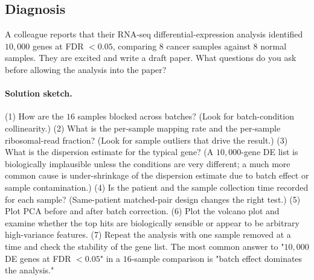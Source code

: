 \subsection*{Diagnosis}

\begin{exercise}
A colleague reports that their RNA-seq differential-expression
analysis identified $10{,}000$ genes at FDR $< 0.05$, comparing
$8$ cancer samples against $8$ normal samples. They are excited and
write a draft paper. What questions do you ask before allowing the
analysis into the paper?

\paragraph{Solution sketch.}
(1) How are the $16$ samples blocked across batches? (Look for
batch-condition collinearity.) (2) What is the per-sample mapping
rate and the per-sample ribosomal-read fraction? (Look for sample
outliers that drive the result.) (3) What is the dispersion estimate
for the typical gene? (A $10{,}000$-gene DE list is biologically
implausible unless the conditions are very different; a much more
common cause is under-shrinkage of the dispersion estimate due to
batch effect or sample contamination.) (4) Is the patient and the
sample collection time recorded for each sample? (Same-patient
matched-pair design changes the right test.) (5) Plot PCA before
and after batch correction. (6) Plot the volcano plot and examine
whether the top hits are biologically sensible or appear to be
arbitrary high-variance features. (7) Repeat the analysis with one
sample removed at a time and check the stability of the gene list.
The most common answer to "$10{,}000$ DE genes at FDR $< 0.05$" in
a $16$-sample comparison is "batch effect dominates the analysis."
\end{exercise}

